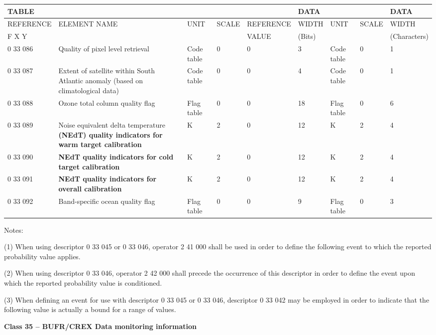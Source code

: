 \begin{longtable}[]{@{}lllllllll@{}}
\toprule
TABLE & & & & & DATA & & & DATA\tabularnewline
\midrule
\endhead
REFERENCE & ELEMENT NAME & UNIT & SCALE & REFERENCE & WIDTH & UNIT & SCALE & WIDTH\tabularnewline
F X Y & & & & VALUE & (Bits) & & & (Characters)\tabularnewline
0 33 086 & Quality of pixel level retrieval & Code table & 0 & 0 & 3 & Code table & 0 & 1\tabularnewline
0 33 087 & Extent of satellite within South Atlantic anomaly (based on climatological data) & Code table & 0 & 0 & 4 & Code table & 0 & 1\tabularnewline
0 33 088 & Ozone total column quality flag & Flag table & 0 & 0 & 18 & Flag table & 0 & 6\tabularnewline
0 33 089 & Noise equivalent delta temperature \textbf{(NEdT) quality indicators for warm target calibration} & K & 2 & 0 & 12 & K & 2 & 4\tabularnewline
0 33 090 & \textbf{NEdT quality indicators for cold target calibration} & K & 2 & 0 & 12 & K & 2 & 4\tabularnewline
0 33 091 & \textbf{NEdT quality indicators for overall calibration} & K & 2 & 0 & 12 & K & 2 & 4\tabularnewline
0 33 092 & Band-specific ocean quality flag & Flag table & 0 & 0 & 9 & Flag table & 0 & 3\tabularnewline
\bottomrule
\end{longtable}

Notes:

(1) When using descriptor 0 33 045 or 0 33 046, operator 2 41 000 shall be used in order to define the following event to which the reported probability value applies.

(2) When using descriptor 0 33 046, operator 2 42 000 shall precede the occurrence of this descriptor in order to define the event upon which the reported probability value is conditioned.

(3) When defining an event for use with descriptor 0 33 045 or 0 33 046, descriptor 0 33 042 may be employed in order to indicate that the following value is actually a bound for a range of values.

\textbf{Class 35 -- BUFR/CREX Data monitoring information}

